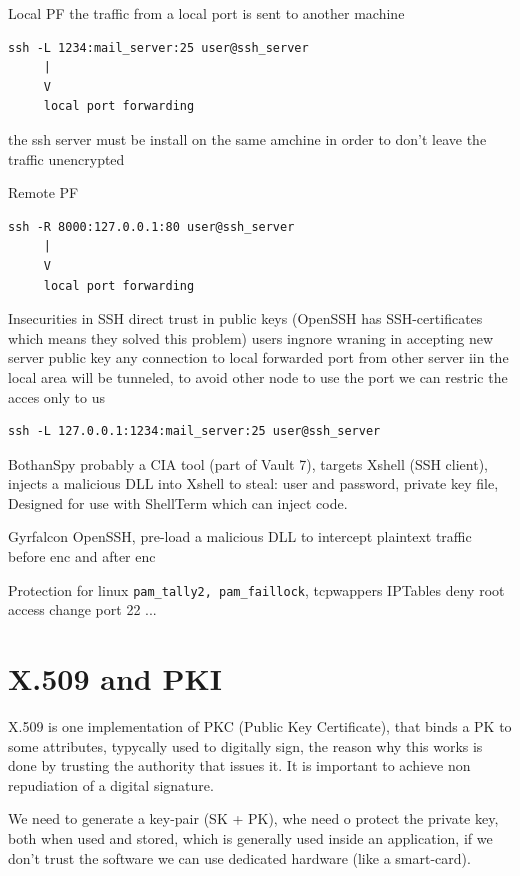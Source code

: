 \documentclass[12pt]{article}
\begin{document}
Local PF
the traffic from a local port is sent to another machine
\begin{lstlisting}
ssh -L 1234:mail_server:25 user@ssh_server
     |
     V
     local port forwarding
\end{lstlisting}
the ssh server must be install on the same amchine in order to don't leave the traffic unencrypted

Remote PF
\begin{lstlisting}
ssh -R 8000:127.0.0.1:80 user@ssh_server
     |
     V
     local port forwarding
\end{lstlisting}


Insecurities in SSH
direct trust in public keys (OpenSSH has SSH-certificates which means they solved this problem)
users ingnore wraning in accepting new server public key
any connection to local forwarded port from other server iin the local area will be tunneled, to avoid other node to use the port we can restric the acces only to us
\begin{lstlisting}
ssh -L 127.0.0.1:1234:mail_server:25 user@ssh_server
\end{lstlisting}


BothanSpy
probably a CIA tool (part of Vault 7), targets Xshell (SSH client), injects a malicious DLL into Xshell to steal: user and password, private key file,
Designed for use with ShellTerm which can inject code.

Gyrfalcon
OpenSSH, pre-load a malicious DLL to intercept plaintext traffic before enc and after enc


Protection for linux
\verb|pam_tally2, pam_faillock|,
tcpwappers
IPTables
deny root access
change port 22
...


\section{X.509 and PKI}
X.509 is one implementation of PKC (Public Key Certificate), that binds a PK to some attributes, typycally used to digitally sign, the reason why this works is done by trusting the authority that issues it. It is important to achieve non repudiation of a digital signature.

We need to generate a key-pair (SK + PK), whe need o protect the private key, both when used and stored, which is generally used inside an application, if we don't trust the software we can use dedicated hardware (like a smart-card).
\end{document}

